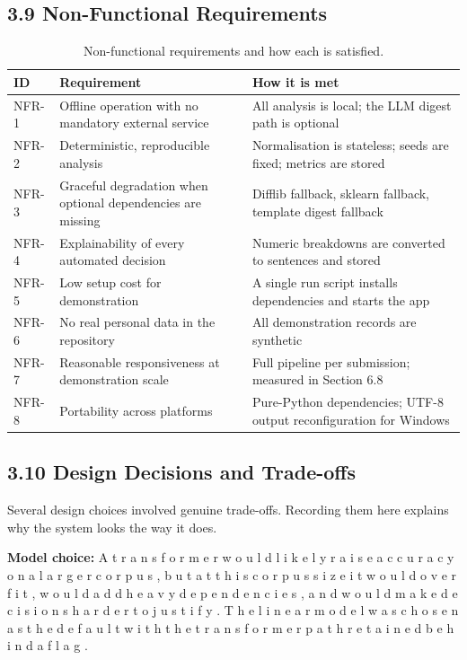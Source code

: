 \documentclass[10pt,letterpaper,oneside]{article}\usepackage{geometry}\geometry{top=1in,bottom=1in,left=1in,right=1in,includeheadfoot}\usepackage{xcolor}\definecolor{color@navy}{HTML}{1F3B63}\definecolor{color@grey}{HTML}{404040}\definecolor{color@hdr}{HTML}{F2F4F7}\usepackage{titlesec}\titleformat{\section}  {\normalfont\huge\bfseries\color@navy}  {}{0pt}{\MakeUppercase}\titleformat{\subsection}  {\normalfont\Large\bfseries\color@navy}  {}{0pt}{}\titleformat{\subsubsection}  {\normalfont\large\bfseries\color@navy}  {}{0pt}{}\titlespacing*{\section}{0pt}{14pt}{6pt}\titlespacing*{\subsection}{0pt}{10pt}{4pt}\titlespacing*{\subsubsection}{0pt}{8pt}{3pt}\setlength{\parindent}{0pt}\setlength{\parskip}{0.6em}\parindent=0pt\usepackage{enumitem}\setlist{nosep,leftmargin=*,itemsep=0pt,topsep=2pt,partopsep=0pt}\usepackage{array}\usepackage{booktabs}\usepackage{caption}\captionsetup{font={small,it},labelfont={bf},labelsep=period,  parskip=2pt,skip=4pt,list=no}\captionsetup[table]{labelfont={bf,small,color@navy},name=Table}\usepackage{graphicx}\usepackage{verbatim}\usepackage{ragged2e}\usepackage{longtable}\usepackage{tabularx}\usepackage{multirow}\usepackage{colortbl}\definecolor{rowshade}{HTML}{F2F4F7}\usepackage{tikz}\usetikzlibrary{positioning,calc}\usepackage[hidelinks]{hyperref}\hypersetup{colorlinks=true,linkcolor=color@navy,urlcolor=color@navy}\pagestyle{fancy}\fancyhf{}\renewcommand{\headrulewidth}{0.4pt}\fancyhead[L]{\small\color@navy CivicSense — Project Report}\fancyhead[R]{\small\color@grey October 11, 2026}\fancyfoot[C]{\small\color@grey An Integrated Intelligent Triage Pipelin}\fancyfoot[R]{\small\color@grey Page \thepage}\usepackage{setspace}\setstretch{1.15}\AtBeginDocument{  \hypersetup{pdftitle={An Integrated Intelligent Triage Pipeline for AI-Enhanced Citizen Complaint Management},    pdfauthor={CivicSense Project Team},    pdfsubject={Project Report},    pdfkeywords={smart cities, NLP, complaint management, e-governance},    pdfcreator={CivicSense Project Team}  }}
\begin{document}
\subsection*{3.9 Non-Functional Requirements}
\begin{table}[htbp]
\centering
\small
\begin{tabular}{@{}lll@{}}
\toprule
ID & Requirement & How it is met \\
\midrule
NFR-1 & Offline operation with no mandatory external service & All analysis is local; the LLM digest path is optional \\
NFR-2 & Deterministic, reproducible analysis & Normalisation is stateless; seeds are fixed; metrics are stored \\
NFR-3 & Graceful degradation when optional dependencies are missing & Difflib fallback, sklearn fallback, template digest fallback \\
NFR-4 & Explainability of every automated decision & Numeric breakdowns are converted to sentences and stored \\
NFR-5 & Low setup cost for demonstration & A single run script installs dependencies and starts the app \\
NFR-6 & No real personal data in the repository & All demonstration records are synthetic \\
NFR-7 & Reasonable responsiveness at demonstration scale & Full pipeline per submission; measured in Section 6.8 \\
NFR-8 & Portability across platforms & Pure-Python dependencies; UTF-8 output reconfiguration for Windows \\
\bottomrule
\end{tabular}
\caption{Non-functional requirements and how each is satisfied.}
\end{table}

\subsection*{3.10 Design Decisions and Trade-offs}
Several design choices involved genuine trade-offs. Recording them here explains why the system looks the way it does.

\item \textbf{Model choice: } A   t r a n s f o r m e r   w o u l d   l i k e l y   r a i s e   a c c u r a c y   o n   a   l a r g e r   c o r p u s ,   b u t   a t   t h i s   c o r p u s   s i z e   i t   w o u l d   o v e r f i t ,   w o u l d   a d d   h e a v y   d e p e n d e n c i e s ,   a n d   w o u l d   m a k e   d e c i s i o n s   h a r d e r   t o   j u s t i f y .   T h e   l i n e a r   m o d e l   w a s   c h o s e n   a s   t h e   d e f a u l t   w i t h   t h e   t r a n s f o r m e r   p a t h   r e t a i n e d   b e h i n d   a   f l a g .
\end{document}
